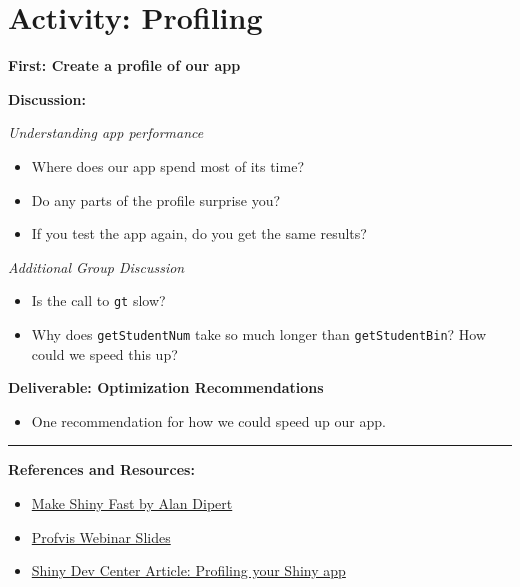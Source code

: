 \documentclass[]{book}
\providecommand{\tightlist}{%
  \setlength{\itemsep}{0pt}\setlength{\parskip}{0pt}}
\theoremstyle{definition}
\theoremstyle{definition}
\theoremstyle{definition}
\theoremstyle{remark}
\begin{document}
\hypertarget{activity-profiling}{%
\section{Activity: Profiling}\label{activity-profiling}}

\textbf{First: Create a profile of our app}

\textbf{Discussion:}

\emph{Understanding app performance}

\begin{itemize}
\tightlist
\item
  Where does our app spend most of its time?
\item
  Do any parts of the profile surprise you?
\item
  If you test the app again, do you get the same results?
\end{itemize}

\emph{Additional Group Discussion}

\begin{itemize}
\tightlist
\item
  Is the call to \texttt{gt} slow?
\item
  Why does \texttt{getStudentNum} take so much longer than
  \texttt{getStudentBin}? How could we speed this up?
\end{itemize}

\textbf{Deliverable: Optimization Recommendations}

\begin{itemize}
\tightlist
\item
  One recommendation for how we could speed up our app.
\end{itemize}

\begin{center}\rule{0.5\linewidth}{\linethickness}\end{center}

\textbf{References and Resources:}

\begin{itemize}
\tightlist
\item
  \href{https://tailrecursion.com/slides/fast-shiny/\#/title-slide}{Make
  Shiny Fast by Alan Dipert}
\item
  \href{https://github.com/rstudio/webinars/blob/master/26-Profiling/Profiling.pdf}{Profvis
  Webinar Slides}
\item
  \href{http://shiny.rstudio.com/articles/profiling.html}{Shiny Dev
  Center Article: Profiling your Shiny app}
\end{itemize}
\end{document}

